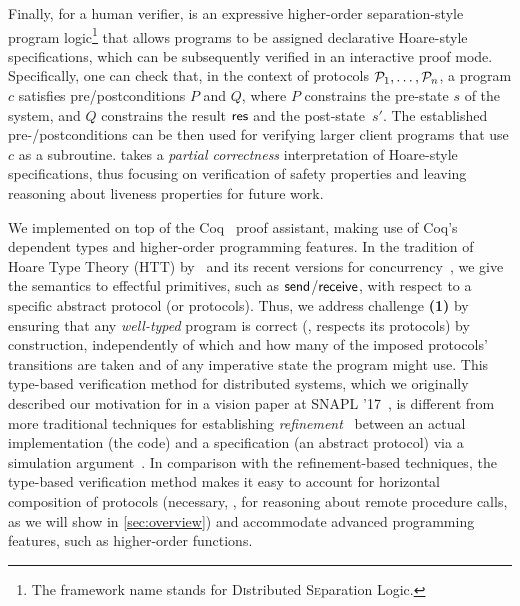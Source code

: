 Finally, for a human verifier, \disel is an expressive higher-order
separation-style program logic\footnote{The framework name stands for
  \textsc{Di}stributed \textsc{Se}paration \textsc{L}ogic.} that
allows programs to be assigned declarative Hoare-style specifications,
which can be subsequently verified in an interactive proof
mode. Specifically, one can check that, in the context of protocols
$\mathcal{P}_1, \ldots, \mathcal{P}_n$, a program $c$ satisfies pre/postconditions
$P$ and $Q$, where $P$ constrains the pre-state $s$ of the system, and
$Q$ constrains the result $\mathsf{res}$ and the post-state~$s'$.
%
%
The established pre-/postconditions can be then used for verifying
larger client programs that use $c$ as a subroutine.
%
\disel takes a \emph{partial correctness} interpretation of
Hoare-style specifications, thus focusing on verification of safety
properties and leaving reasoning about liveness properties for future
work.

We implemented \disel on top of the Coq~\cite{Coq-manual} proof
assistant, making use of Coq's dependent types and higher-order
programming features. In the tradition of Hoare Type Theory (HTT)
by~\citet{Nanevski-al:ICFP06,nanevski:ynot,Nanevski-al:POPL10}
and its recent versions for
concurrency~\cite{LeyWild-Nanevski:POPL13,Nanevski-al:ESOP14}, we give
the semantics to effectful primitives, such as $\mathsf{send}$/$\mathsf{receive}$,
with respect to a specific abstract protocol (or protocols).
%
Thus, we address challenge \textbf{(1)} by ensuring that any
\emph{well-typed} program is correct (\ie, respects its protocols) by
construction, independently of which and how many of the imposed
protocols' transitions are taken and of any imperative state the
program might use.
%
This type-based verification method for distributed systems, which we
originally described our motivation for in a vision paper at SNAPL '17~\cite{Wilcox-al:SNAPL17}, is
different from more traditional techniques for establishing
\emph{refinement}~\cite{Abadi-Lamport:LICS88,Hawblitzel-al:SOSP15}
between an actual implementation (the code) and a specification (an
abstract protocol) via a simulation
argument~\cite{Lynch-Vaandrager:IC95}.
%
In comparison with the refinement-based techniques, the type-based
verification method makes it easy to account for horizontal
composition of protocols (necessary, \eg, for reasoning about remote
procedure calls, as we will show in \cref{sec:overview}) and
accommodate advanced programming features, such as higher-order
functions.

